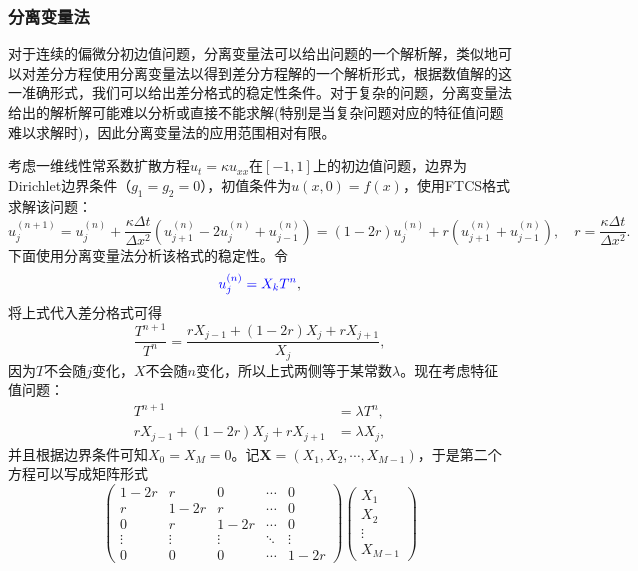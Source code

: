 \documentclass[a4paper,10pt]{ctexart}
\begin{document}
\subsubsection{分离变量法}
对于连续的偏微分初边值问题，分离变量法可以给出问题的一个解析解，类似地可以对差分方程使用分离变量法以得到差分方程解的一个解析形式，根据数值解的这一准确形式，我们可以给出差分格式的稳定性条件。对于复杂的问题，分离变量法给出的解析解可能难以分析或直接不能求解(特别是当复杂问题对应的特征值问题难以求解时)，因此分离变量法的应用范围相对有限。
\begin{example}
    考虑一维线性常系数扩散方程$ u_t = \kappa u_{xx} $在$ [-1,1] $上的初边值问题，边界为Dirichlet边界条件（$ g_1=g_2=0 $），初值条件为$ u(x,0) = f(x) $，使用FTCS格式求解该问题：
    \[
        u^{(n+1)}_j = u^{(n)}_j + \frac{\kappa \Delta t}{\Delta x^2} (u^{(n)}_{j+1} - 2u^{(n)}_j + u^{(n)}_{j-1}) = (1-2r)u^{(n)}_j + r(u^{(n)}_{j+1} + u^{(n)}_{j-1}),\quad r = \frac{\kappa \Delta t}{\Delta x^2}.
    \]
    下面使用分离变量法分析该格式的稳定性。令
    \begin{equation}
        \textcolor{blue}{u^{(n)}_j = X_k T^n},
    \end{equation}
    将上式代入差分格式可得
    \[
        \frac{T^{n+1}}{T^n} = \frac{rX_{j-1}+(1-2r)X_j+rX_{j+1}}{X_j},
    \]
    因为$ T $不会随$ j $变化，$ X $不会随$ n $变化，所以上式两侧等于某常数$ \lambda $。现在考虑特征值问题：
    \[
        \begin{aligned}
            T^{n+1} &= \lambda T^n,\\
            rX_{j-1}+(1-2r)X_j+rX_{j+1} &= \lambda X_j,
        \end{aligned}
    \]
    并且根据边界条件可知$ X_0 = X_M = 0 $。记$ \bm{X} = (X_1,X_2,\cdots ,X_{M-1}) $，于是第二个方程可以写成矩阵形式
    \[
        \begin{pmatrix}
            1-2r & r & 0 & \cdots & 0\\
            r & 1-2r & r & \cdots & 0\\
            0 & r & 1-2r & \cdots & 0\\
            \vdots & \vdots & \vdots & \ddots & \vdots\\
            0 & 0 & 0 & \cdots & 1-2r
        \end{pmatrix}
        \begin{pmatrix}
            X_1\\
            X_2\\
            \vdots\\
            X_{M-1}
        \end{pmatrix}
\]
\end{example}
\end{document}
